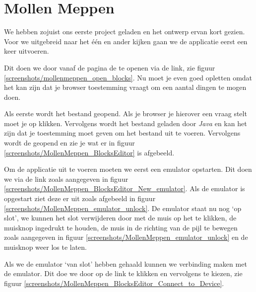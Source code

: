 \chapter{Mollen Meppen}

We hebben zojuist ons eerste project geladen en het ontwerp ervan kort gezien. Voor we uitgebreid naar het \'e\'en en ander kijken gaan we de applicatie eerst een keer uitvoeren.

Dit doen we door vanaf de  pagina de  te openen via 
de  link, zie figuur \ref{screenshots/mollenmeppen_open_blocks}. Nu moet je even goed opletten omdat het kan zijn dat je browser toestemming vraagt om een aantal dingen te mogen doen.


Als eerste wordt het  bestand geopend. Als je browser je hierover een vraag stelt moet je op  klikken. Vervolgens wordt het bestand geladen door \emph{Java} en kan het zijn dat je toestemming moet geven om het bestand uit te voeren. Vervolgens wordt de  geopend en zie je wat er in figuur \ref{screenshots/MollenMeppen_BlocksEditor} is afgebeeld.


\runOpTelefoon{} 

Om de applicatie uit te voeren moeten we eerst een emulator opstarten. Dit doen we via de  link zoals aangegeven in figuur \ref{screenshots/MollenMeppen_BlocksEditor_New_emulator}. Als de emulator is opgestart ziet deze er uit zoals afgebeeld in figuur \ref{screenshots/MollenMeppen_emulator_unlock}. De emulator staat nu nog `op slot', we kunnen het slot verwijderen door met de muis op het  te klikken, de muisknop ingedrukt te houden, de muis in de richting van de pijl te bewegen zoals aangegeven in figuur \ref{screenshots/MollenMeppen_emulator_unlock} en de muisknop weer los te laten.


Als we de emulator `van slot' hebben gehaald kunnen we verbinding maken met de emulator. Dit doe we door op de  link te klikken en vervolgens  te kiezen, zie figuur \ref{screenshots/MollenMeppen_BlocksEditor_Connect_to_Device}.


